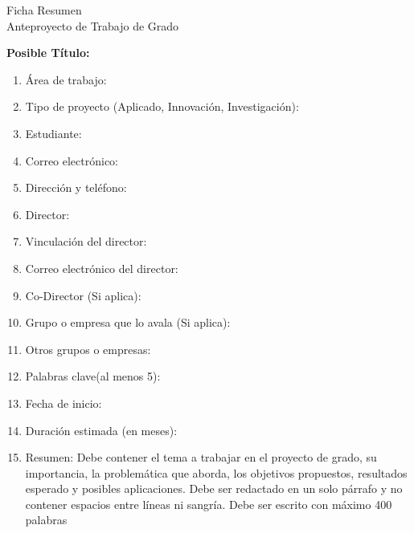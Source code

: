 \thispagestyle{empty}
\begin{center}
    \Large{Ficha Resumen \\ Anteproyecto de Trabajo de Grado}
\end{center}

\textbf{Posible Título:}
\begin{enumerate}
    \item Área de trabajo:
    \item Tipo de proyecto (Aplicado, Innovación, Investigación):
    \item Estudiante:
    \item Correo electrónico:
    \item Dirección y teléfono:
    \item Director:
    \item Vinculación del director:
    \item Correo electrónico del director:
    \item Co-Director (Si aplica):
    \item Grupo o empresa que lo avala (Si aplica):
    \item Otros grupos o empresas:
    \item Palabras clave(al menos 5):
    \item Fecha de inicio:
    \item Duración estimada (en meses):
    \item Resumen:  Debe contener el tema a trabajar en el proyecto de grado, su importancia, la problemática que aborda, los objetivos propuestos, resultados esperado y posibles aplicaciones.  Debe ser redactado en un solo párrafo y no contener espacios entre líneas ni sangría.  Debe ser escrito con máximo 400 palabras 
\end{enumerate}
